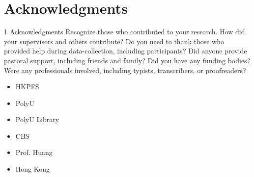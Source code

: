 \chapter*{Acknowledgments}
\label{ch:acknowledgments}

1 Acknowledgments
Recognize those who contributed to your research.
How did your supervisors and others contribute?
Do you need to thank those who provided help during data-collection, including participants?
Did anyone provide pastoral support, including friends and family?
Did you have any funding bodies?
Were any professionals involved, including typists, transcribers, or proofreaders?

\begin{itemize}
    \item HKPFS
    \item PolyU
    \item PolyU Library
    \item CBS
    \item Prof. Huang
    \item Hong Kong
\end{itemize}
